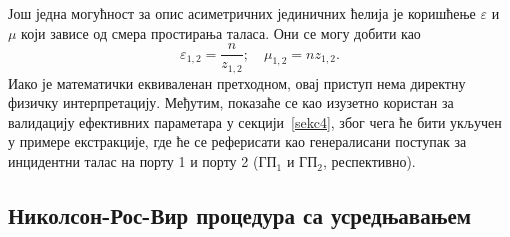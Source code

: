 Још једна могућност за опис асиметричних јединичних ћелија је коришћење $\varepsilon$ и $\mu$ који зависе од смера простирања таласа. Они се могу добити као
\begin{equation}
\varepsilon_{1,2}=\frac{n}{z_{1,2}};\quad \mu_{1,2}=nz_{1,2}.
\end{equation}
Иако је математички еквиваленан претходном, овај приступ нема директну физичку интерпретацију. Међутим, показаће се као изузетно користан за валидацију ефективних параметара у секцији~\ref{sekc4}, због чега ће бити укључен у примере екстракције, где ће се реферисати као генералисани поступак за инцидентни талас на порту 1 и порту 2 ($ГП_1$ и $ГП_2$, респективно).

\subsection{Николсон-Рос-Вир процедура са усредњавањем}

